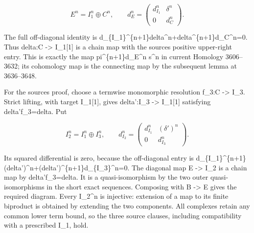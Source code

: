 \documentclass[11pt]{article}
\begin{document}
\[
 E^n=I_1^n\oplus C^n,\qquad
 d_E^n=\begin{pmatrix}d_{I_1}^n&\delta^n\\0&d_C^n\end{pmatrix}.
                                                               \tag{6.2}
\]

The full off-diagonal identity is d\_\allowbreak{}\{I\_\allowbreak{}1\}\textasciicircum{}\{n\allowbreak{}+1\}delta\textasciicircum{}n\allowbreak{}+delta\textasciicircum{}\{n\allowbreak{}+1\}d\_\allowbreak{}C\textasciicircum{}n\allowbreak{}=0. Thus delta:\allowbreak{}C \allowbreak{}-> I\_\allowbreak{}1[1]\allowbreak{} is a chain map with the source\textquotesingle s positive upper-right entry. This is exactly the map pi\textasciicircum{}\{n\allowbreak{}+1\}d\_\allowbreak{}E\textasciicircum{}n s\^{}n in current Homology 3606–\allowbreak{}3632; its cohomology map is the connecting map by the subsequent lemma at 3636–\allowbreak{}3648.

For the source\textquotesingle s proof,\allowbreak{} choose a termwise monomorphic resolution f\_\allowbreak{}3:\allowbreak{}C \allowbreak{}-> I\_\allowbreak{}3. Strict lifting,\allowbreak{} with target I\_\allowbreak{}1[1]\allowbreak{},\allowbreak{} gives delta':\allowbreak{}I\_\allowbreak{}3 \allowbreak{}-> I\_\allowbreak{}1[1]\allowbreak{} satisfying delta'f\_\allowbreak{}3\allowbreak{}=delta. Put

\[
 I_2^n=I_1^n\oplus I_3^n,\qquad
 d_{I_2}^n=\begin{pmatrix}d_{I_1}^n&(\delta')^n\\0&d_{I_3}^n\end{pmatrix}.
                                                               \tag{6.3}
\]

Its squared differential is zero,\allowbreak{} because the off-diagonal entry is d\_\allowbreak{}\{I\_\allowbreak{}1\}\textasciicircum{}\{n\allowbreak{}+1\}(delta')\allowbreak{}\textasciicircum{}n\allowbreak{}+(delta')\allowbreak{}\textasciicircum{}\{n\allowbreak{}+1\}d\_\allowbreak{}\{I\_\allowbreak{}3\}\textasciicircum{}n\allowbreak{}=0. The diagonal map E \allowbreak{}-> I\_\allowbreak{}2 is a chain map by delta'f\_\allowbreak{}3\allowbreak{}=delta. It is a quasi-isomorphism by the two outer quasi-isomorphisms in the short exact sequences. Composing with B \allowbreak{}-> E gives the required diagram. Every I\_\allowbreak{}2\textasciicircum{}n is injective:\allowbreak{} extension of a map to its finite biproduct is obtained by extending the two components. All complexes retain any common lower term bound,\allowbreak{} so the three source clauses,\allowbreak{} including compatibility with a prescribed I\_\allowbreak{}1,\allowbreak{} hold.
\end{document}
